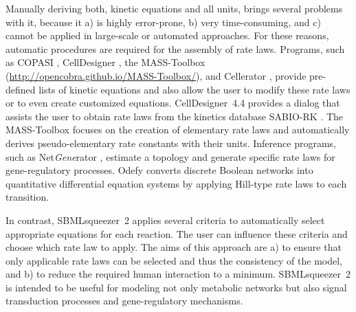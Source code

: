 \documentclass{bioinfo}
\begin{document}
Manually deriving both, kinetic equations and all units, brings several problems with it, because it
a) is highly error-prone, %
b) very time-consuming, and
c) cannot be applied in large-scale or automated approaches.
For these reasons, %
automatic procedures are required for the assembly of rate laws.
Programs, such as
COPASI \citep{Hoops2006}, 
CellDesigner \citep{Funahashi2007}, %
the MASS-Toolbox (\url{http://opencobra.github.io/MASS-Toolbox/}), and 
Cellerator \citep{Shapiro2002}, 
provide pre-defined lists of kinetic equations and also allow the user to modify these rate laws or to even create customized equations.
CellDesigner~4.4 %
provides a dialog that assists the user to obtain rate laws from the kinetics database SABIO-RK \citep{Wittig2012}.
The MASS-Toolbox focuses on the creation of elementary rate laws and automatically derives pseudo-elementary rate constants with their units.
Inference programs, such as Net\emph{Gene}rator \citep{Weber2013}, estimate a topology and generate specific rate laws  for gene-regulatory processes. 
Odefy \citep{Krumsiek2010} converts discrete Boolean networks into quantitative differential equation systems by applying Hill-type rate laws to each transition. %

In contrast, SBMLsqueezer~2 applies several criteria to automatically select appropriate equations for each reaction.
The user can influence these criteria %
and choose which rate law to apply.
The aims of this approach are
a) to ensure that only applicable rate laws can be selected and thus the consistency of the model, and
b) to reduce the required human interaction to a minimum.
SBMLsqueezer~2 is intended to be useful for modeling not only metabolic networks but also signal transduction processes and gene-regulatory mechanisms.
\end{document}
